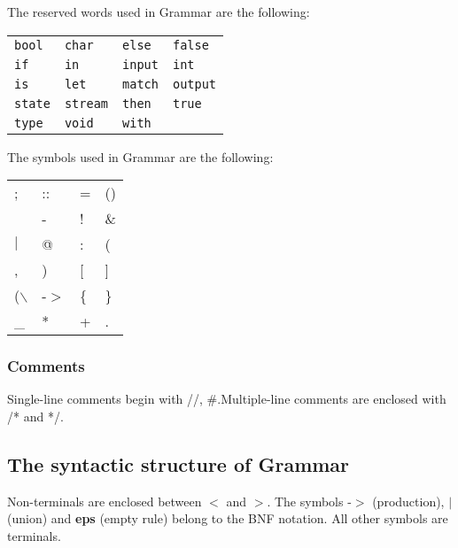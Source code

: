 \documentclass{article}
\begin{document}
The reserved words used in Grammar are the following:

\begin{center}\begin{tabular}{llll}
\texttt{bool} & \texttt{char} & \texttt{else} & \texttt{false} \\
\texttt{if} & \texttt{in} & \texttt{input} & \texttt{int} \\
\texttt{is} & \texttt{let} & \texttt{match} & \texttt{output} \\
\texttt{state} & \texttt{stream} & \texttt{then} & \texttt{true} \\
\texttt{type} & \texttt{void} & \texttt{with} \\
\end{tabular}\end{center}

The symbols used in Grammar are the following:

\begin{center}\begin{tabular}{llll}
; & :: & = & () \\
[] & - & ! & \& \\
$|$ & @ & : & ( \\
, & ) & [ & ] \\
($\backslash$ & -$>$ & \{ & \} \\
\_ & * & + & . \\
\end{tabular}\end{center}

\subsubsection*{Comments}

Single-line comments begin with //, \#.Multiple-line comments are  enclosed with /* and */.

\subsection*{The syntactic structure of Grammar}

Non-terminals are enclosed between $<$ and $>$. 
The symbols -$>$ (production),  \textbf{$|$}  (union) 
and \textbf{eps} (empty rule) belong to the BNF notation. 
All other symbols are terminals.
\end{document}
